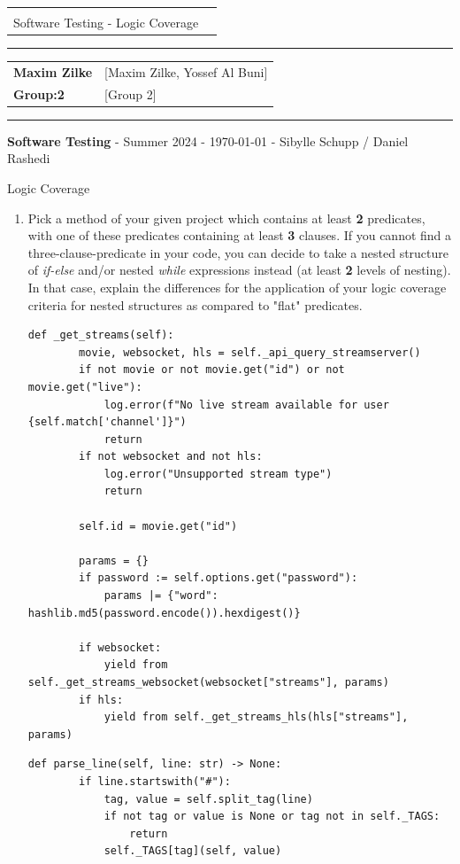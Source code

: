 \documentclass[a4paper]{scrreprt}
\newcommand{\baseinfo}[5]{
  \begin{center}
    \begin{tabular}{p{15cm}r}
      \vspace{-4.5pt}{ \Large \bfseries #1} & \multirow{2}{*}{} \\[0.4cm]
      #2 & \\[0.5cm]
    \end{tabular}
  \end{center}
  \vspace{-18pt}\hrule\vspace{6pt}
  \begin{tabular}{ll}
    \textbf{Maxim Zilke} & #4\\
    \textbf{Group:2} & #5\\
  \end{tabular}
  \vspace{4pt}\hrule\vspace{2pt}
  \footnotesize \textbf{Software Testing} \hfil - \hfil Summer 2024 \hfil - \hfil #3 \hfil - \hfil Sibylle Schupp / Daniel Rashedi \hfil \\
}
\newcounter{question}
\newcommand{\projectinfo}[4]{\baseinfo{Project Task 04 - Submission Sheet}{#1}{#2}{#3}{#4}}
\newcommand{\name}{[Maxim Zilke, Yossef Al Buni]}
\newcommand{\group}{[Group 2]}
\begin{document}
\projectinfo{Software Testing - Logic Coverage\small}{\today}{\name}{\group}

\addtocounter{question}{3}


\begin{question}{Logic Coverage}
  \begin{enumerate}[topsep=0pt, leftmargin=*]
    \item Pick a method of your given project which contains at least \textbf{2} predicates, with one of these predicates containing at least \textbf{3} clauses. If you cannot find a three-clause-predicate in your code, you can decide to take a nested structure of \textit{if-else} and/or nested \textit{while} expressions instead (at least \textbf{2} levels of nesting). In that case, explain the differences for the application of your logic coverage criteria for nested structures as compared to "flat" predicates.
          \begin{answer}

\begin{lstlisting}[caption={Funktion \texttt{\_get\_streams} by Maxim Zilke}, label={lst:_get_streams}]
def _get_streams(self):
        movie, websocket, hls = self._api_query_streamserver()
        if not movie or not movie.get("id") or not movie.get("live"):
            log.error(f"No live stream available for user {self.match['channel']}")
            return
        if not websocket and not hls:
            log.error("Unsupported stream type")
            return

        self.id = movie.get("id")

        params = {}
        if password := self.options.get("password"):
            params |= {"word": hashlib.md5(password.encode()).hexdigest()}

        if websocket:
            yield from self._get_streams_websocket(websocket["streams"], params)
        if hls:
            yield from self._get_streams_hls(hls["streams"], params)
\end{lstlisting}
\begin{lstlisting}[caption={Function \texttt{parse\_line} by Yossef Al Buni}, label={lst:parse_line}]
    def parse_line(self, line: str) -> None:
        if line.startswith("#"):
            tag, value = self.split_tag(line)
            if not tag or value is None or tag not in self._TAGS:
                return
            self._TAGS[tag](self, value)


\end{lstlisting}
\end{answer}
\end{enumerate}
\end{question}
\end{document}
